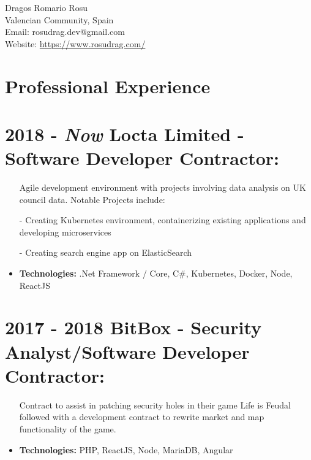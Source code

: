 \documentclass[12pt,a4paper]{res}
\begin{document}
\thispagestyle{empty}
  \begin{center}
  \Large{Dragos Romario Rosu  \\ [12pt]}
  \normalsize Valencian Community, Spain\\
  Email: rosudrag.dev@gmail.com\\
  Website: \url{https://www.rosudrag.com/}
  \end{center}
  
\begin{resume}
\vspace{-10mm}
\section{\large\bf Professional Experience}

\section{\bf 2018 - \textit{Now} \hspace{0.6mm} Locta Limited - Software Developer Contractor:}
\vspace{5mm}    
	\begin{itemize}
	\item[] Agile development environment with projects involving data analysis on UK council data. Notable Projects include: 
  \item[-] Creating Kubernetes environment, containerizing existing applications and developing microservices
  \item[-] Creating search engine app on ElasticSearch
	\item \textbf{Technologies:} .Net Framework / Core, C\#, Kubernetes, Docker, Node, ReactJS
	\end{itemize}
\section{\bf 2017 - 2018 \hspace{0.3mm} BitBox - Security Analyst/Software Developer Contractor:}
\vspace{5mm}    
	\begin{itemize}
	\item[]Contract to assist in patching security holes in their game Life is Feudal followed with a development contract to rewrite market and map functionality of the game.
	\item \textbf{Technologies:} PHP, ReactJS, Node, MariaDB, Angular
	\end{itemize}

\end{resume}
\end{document}
